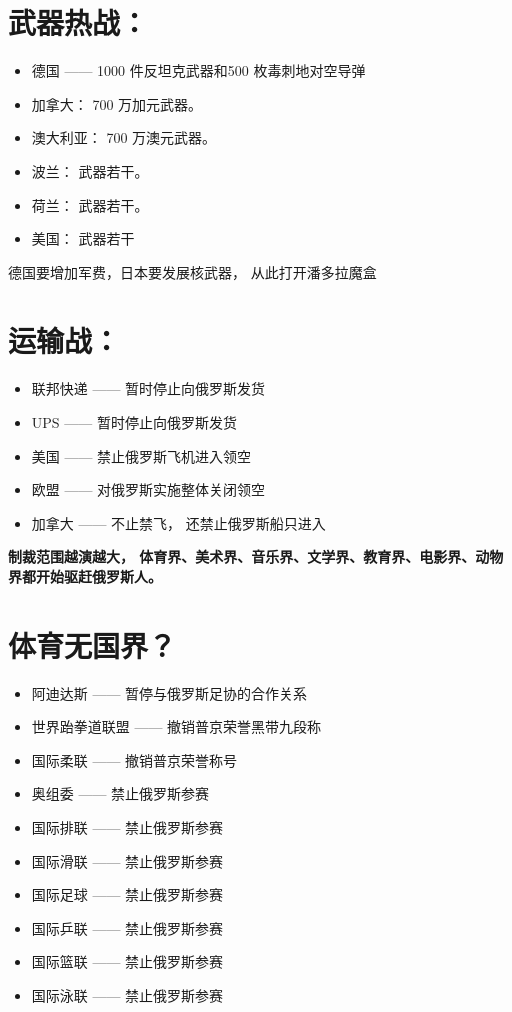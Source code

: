 \documentclass[UTF8, 11pt, oneside]{ctexart}
\begin{document}
\section{武器热战：}

\begin{itemize}
    \item 德国 —— 1000 件反坦克武器和500 枚毒刺地对空导弹
    \item 加拿大： 700 万加元武器。
    \item 澳大利亚： 700 万澳元武器。
    \item 波兰： 武器若干。
    \item 荷兰： 武器若干。
    \item 美国： 武器若干
\end{itemize}

德国要增加军费，日本要发展核武器， 从此打开潘多拉魔盒


\section{运输战：}

\begin{itemize}
    \item 联邦快递 —— 暂时停止向俄罗斯发货
    \item UPS  —— 暂时停止向俄罗斯发货
    \item 美国 —— 禁止俄罗斯飞机进入领空
    \item 欧盟 —— 对俄罗斯实施整体关闭领空
    \item 加拿大 —— 不止禁飞， 还禁止俄罗斯船只进入
\end{itemize}

\textbf{制裁范围越演越大， 体育界、美术界、音乐界、文学界、教育界、电影界、动物界都开始驱赶俄罗斯人。}



\section{体育无国界？}

\begin{itemize}
    \item 阿迪达斯 —— 暂停与俄罗斯足协的合作关系
    \item 世界跆拳道联盟 —— 撤销普京荣誉黑带九段称
    \item 国际柔联 —— 撤销普京荣誉称号
    \item 奥组委 —— 禁止俄罗斯参赛
    \item 国际排联 —— 禁止俄罗斯参赛
    \item 国际滑联 —— 禁止俄罗斯参赛
    \item 国际足球 —— 禁止俄罗斯参赛
    \item 国际乒联 —— 禁止俄罗斯参赛
    \item 国际篮联 —— 禁止俄罗斯参赛
    \item 国际泳联 —— 禁止俄罗斯参赛
\end{itemize}
\end{document}
